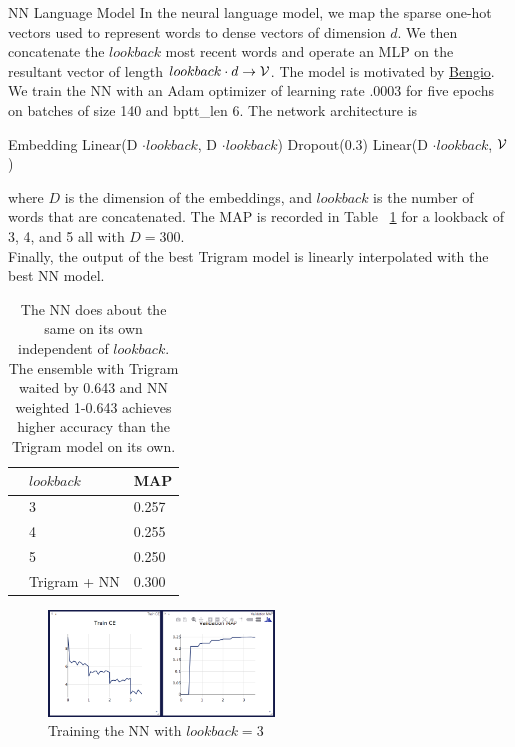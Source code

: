 \documentclass[11pt]{article}
\begin{document}
\begin{subsection}{NN Language Model}
In the neural language model, we map the sparse one-hot vectors used to represent words to dense vectors of dimension $d$. We then concatenate the $lookback$ most recent words and operate an MLP on the resultant vector of length $lookback \cdot d \rightarrow \mathcal{V}$. The model is motivated by \href{http://www.jmlr.org/papers/volume3/bengio03a/bengio03a.pdf}{Bengio}.\\
We train the NN with an Adam optimizer of learning rate .0003 for five epochs on batches of size 140 and bptt\_len 6. The network architecture is\\
\centerline{ Embedding \rightarrow Linear(D $\cdot lookback$, D $\cdot lookback$) \rightarrow Dropout(0.3) \rightarrow Linear(D $\cdot lookback$, $\mathcal{V}$) }
where $D$ is the dimension of the embeddings, and $lookback$ is the number of words that are concatenated. The MAP is recorded in Table ~\ref{tab:NN} for a lookback of 3, 4, and 5 all with $D=300$.\\
Finally, the output of the best Trigram model is linearly interpolated with the best NN model.\\

\begin{table}
  \begin{center}
    \begin{tabular}{@{}lll@{}}
      \toprule
      & $lookback$ & MAP\\
      \midrule
      & 3 & 0.257 \\
      & 4 & 0.255 \\
      & 5 & 0.250 \\
      \bottomrule
      & Trigram + NN & 0.300\\ 
      \bottomrule
    \end{tabular}
  \end{center}
  \caption{\label{tab:NN} The NN does about the same on its own independent of $lookback$. The ensemble with Trigram waited by 0.643 and NN weighted 1-0.643 achieves higher accuracy than the Trigram model on its own.}
 \end{table}
 
 \begin{figure}
  \centering
  \includegraphics[width=6cm]{imgs/nntrain}
  \caption{\label{fig:clusters} Training the NN with $lookback=3$}
\end{figure}


\end{subsection}
\end{document}
